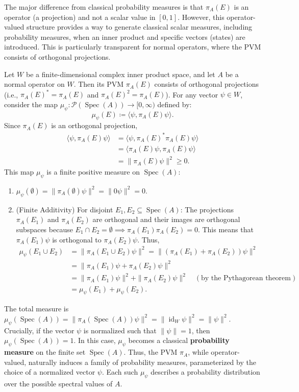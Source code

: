 The major difference from classical probability measures is that $\pi_A(E)$ is an operator (a projection) and not a scalar value in $[0,1]$. However, this operator-valued structure provides a way to generate classical scalar measures, including probability measures, when an inner product and specific vectors (states) are introduced. This is particularly transparent for normal operators, where the PVM consists of orthogonal projections.

Let $W$ be a finite-dimensional complex inner product space, and let $A$ be a normal operator on $W$. Then its PVM $\pi_A(E)$ consists of orthogonal projections (i.e., $\pi_A(E)^* = \pi_A(E)$ and $\pi_A(E)^2 = \pi_A(E)$). For any vector $\psi \in W$, consider the map $\mu_\psi: \mathcal{P}(\operatorname{Spec}(A)) \to [0, \infty)$ defined by:
\[ \mu_\psi(E) \coloneqq \langle \psi, \pi_A(E)\psi \rangle. \]
Since $\pi_A(E)$ is an orthogonal projection, 
\begin{align*}
    \langle \psi, \pi_A(E)\psi \rangle &= \langle \psi, \pi_A(E)^*\pi_A(E)\psi \rangle \\ 
    &= \langle \pi_A(E)\psi, \pi_A(E)\psi \rangle \\ 
    &= \|\pi_A(E)\psi\|^2 \ge 0.
\end{align*}
This map $\mu_\psi$ is a finite positive measure on $\operatorname{Spec}(A)$:
\begin{enumerate}
    \item $\mu_\psi(\emptyset) = \|\pi_A(\emptyset)\psi\|^2 = \|0\psi\|^2 = 0$.
    \item (Finite Additivity) For disjoint $E_1, E_2 \subseteq \operatorname{Spec}(A)$:
    The projections $\pi_A(E_1)$ and $\pi_A(E_2)$ are orthogonal and their images are orthogonal subspaces because $E_1 \cap E_2 = \emptyset \implies \pi_A(E_1)\pi_A(E_2)=0$. This means that $\pi_A(E_1)\psi$ is orthogonal to $\pi_A(E_2)\psi$.
    Thus,
    \begin{align*} \mu_\psi(E_1 \cup E_2) &= \|\pi_A(E_1 \cup E_2)\psi\|^2 = \|(\pi_A(E_1) + \pi_A(E_2))\psi\|^2 \\ &= \|\pi_A(E_1)\psi + \pi_A(E_2)\psi\|^2 \\ &= \|\pi_A(E_1)\psi\|^2 + \|\pi_A(E_2)\psi\|^2 \quad (\text{by the Pythagorean theorem}) \\ &= \mu_\psi(E_1) + \mu_\psi(E_2). \end{align*}
\end{enumerate}
The total measure is $\mu_\psi(\operatorname{Spec}(A)) = \|\pi_A(\operatorname{Spec}(A))\psi\|^2 = \|\operatorname{id}_W \psi\|^2 = \|\psi\|^2$.
Crucially, if the vector $\psi$ is normalized such that $\|\psi\|=1$, then $\mu_\psi(\operatorname{Spec}(A)) = 1$. In this case, $\mu_\psi$ becomes a classical \textbf{probability measure} on the finite set $\operatorname{Spec}(A)$. Thus, the PVM $\pi_A$, while operator-valued, naturally induces a family of probability measures, parameterized by the choice of a normalized vector $\psi$. Each such $\mu_\psi$ describes a probability distribution over the possible spectral values of $A$.

